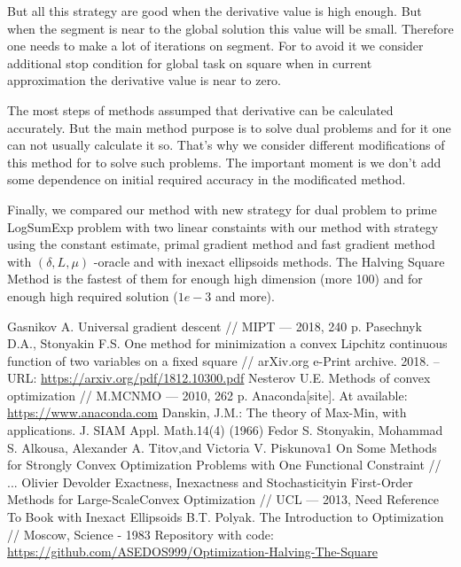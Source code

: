 \documentclass[12pt]{article}
\begin{document}
But all this strategy are good when the derivative value is high enough. But when the segment is near to the global solution this value will be small. Therefore one needs to make a lot of iterations on segment. For to avoid it we consider additional stop condition for global task on square when in current approximation the derivative value is near to zero.

The most steps of methods assumped that derivative can be calculated accurately. But the main method purpose is to solve dual problems and for it one can not usually calculate it so. That's why we consider different modifications of this method for to solve such problems. The important moment is we don't add some dependence on initial required accuracy in the modificated method.

Finally, we compared our method with new strategy for dual problem to prime LogSumExp problem with two linear constaints with our method with strategy using the constant estimate, primal gradient method and fast gradient method with $(\delta, L, \mu)$ -oracle and with inexact ellipsoids methods. The Halving Square Method is the fastest of them for enough high dimension (more 100) and for enough high required solution ($1e-3$ and more).

\newpage
\begin{thebibliography}{3}
Gasnikov A.  Universal gradient descent // MIPT --- 2018, 240 p.
Pasechnyk D.A., Stonyakin F.S.  One method for minimization a convex Lipchitz continuous function of two variables on a fixed square // arXiv.org e-Print archive. 2018. – URL: \href{https://arxiv.org/pdf/1812.10300.pdf}{https://arxiv.org/pdf/1812.10300.pdf}
Nesterov U.E.  Methods of convex optimization // M.MCNMO --- 2010, 262 p.
Anaconda[site]. At available: \href{https://www.anaconda.com}{https://www.anaconda.com}
Danskin, J.M.: The theory of Max-Min, with applications. J. SIAM Appl. Math.14(4) (1966)
Fedor S. Stonyakin, Mohammad S. Alkousa, Alexander A. Titov,and Victoria V. Piskunova1 On Some Methods for Strongly Convex Optimization Problems with One Functional Constraint // ...
Olivier Devolder Exactness, Inexactness and Stochasticityin First-Order Methods for Large-ScaleConvex Optimization // UCL --- 2013,
Need Reference To Book with Inexact Ellipsoids
B.T. Polyak. The Introduction to Optimization // Moscow, Science - 1983
Repository with code: \href{https://github.com/ASEDOS999/Optimization-Halving-The-Square}{https://github.com/ASEDOS999/Optimization-Halving-The-Square}
\end{thebibliography}
\end{document}
